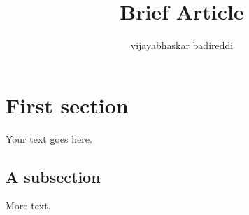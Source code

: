 \documentclass[12pt]{article}
\title{Brief Article}
\author{vijayabhaskar badireddi}
\begin{document}

\section*{First section}

Your text goes here.

\subsection*{A subsection}

More text.
\end{document}
